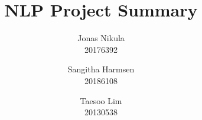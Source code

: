 \documentclass{article}
\title{NLP Project Summary} %
\author{Jonas Nikula \\ 20176392
\and Sangitha Harmsen \\ 20186108
\and Taesoo Lim \\ 20130538} %
\date{} %
\begin{document}
\maketitle %






\printbibliography{}

\end{document}
